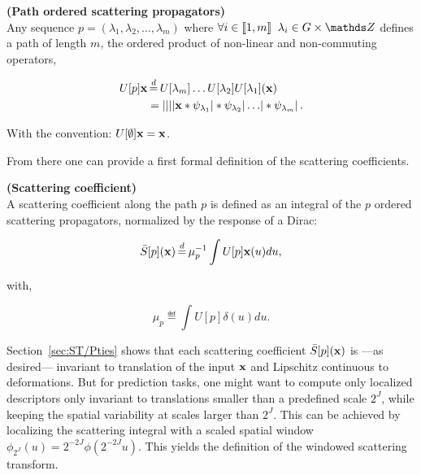 \documentclass[a4paper,11pt]{report}
\begin{document}
			\begin{defn} \textbf{(Path ordered scattering propagators)}\\ 
				Any sequence $p = (\lambda_{1}, \lambda_{2},\dots ,\lambda_{m})$ where $\forall i \in \llbracket 1,m \rrbracket \;\; \lambda_{i} \in G \times \dsZ$ defines a path of length $m$, \ie the ordered product of non-linear and non-commuting operators,
				
				\begin{equation}
					\label{eq:path ordered SP}
					\begin{split}
						U[p]\bfx &\eqdef U[\lambda_{m}]\dots U[\lambda_{2}]U[\lambda_{1}](\bfx) \\
							&= \abs{\abs{\abs{\abs{\bfx \ast \psi_{\lambda_{1}}} \ast \psi_{\lambda_{2}}} 
							\dots } \ast \psi_{\lambda_{m}}}.   
					\end{split}
				\end{equation}
				
				With the convention: $U[\emptyset]{\bf x} = {\bf x}$.\\
				\label{def:path ordered SO}
      \end{defn} 
      
      From there one can provide a first formal definition of the scattering coefficients.
      
      \begin{defn} \textbf{(Scattering coefficient)}\\
				A scattering coefficient along the path $p$ is defined as an integral of the $p$ ordered scattering propagators, normalized by the response of a Dirac:

				\begin{equation}
					\label{eq:ST1}
					\bar{S}[p](\bfx) \eqdef \mu_{p}^{-1} \int U[p]\bfx(u) du,
				\end{equation}
				
				with,
				
				\begin{equation*}
					\label{eq:ST normalization}
					\mu_{p} \eqdef \int U[p]\delta(u)du.      
				\end{equation*}
				\label{def:SC}
      \end{defn}
      
      Section~\ref{sec:ST/Pties} shows that each scattering coefficient $\bar{S}[p]({\bf x})$ is ---as desired--- invariant to translation of the input ${\bf x}$ and Lipschitz continuous to deformations. But for prediction tasks, one might want to compute only localized descriptors only invariant to translations smaller than a predefined scale $2^{J}$, while keeping the spatial variability at scales larger than $2^{J}$. This can be achieved by localizing the scattering integral with a scaled spatial window $\phi_{2^{J}}(u) = 2^{-2J} \phi(2^{-2J}u)$. This yields the definition of the windowed scattering transform.
      
\end{document}
